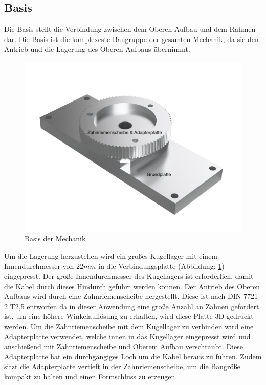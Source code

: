 \subsection{Basis}
Die Basis stellt die Verbindung zwischen dem Oberen Aufbau und dem Rahmen dar. Die Basis ist die komplexeste Baugruppe der gesamten Mechanik, da sie den Antrieb und die Lagerung des Oberen Aufbaus übernimmt. 
\begin{figure}[H]
	\centering
	\includegraphics[width=\textwidth]{images/Mechanik/Basis}
	\caption{Basis der Mechanik}
	\label{basis}
\end{figure}
Um die Lagerung herzustellen wird ein großes Kugellager mit einem Innendurchmesser von $22mm$ in die Verbindungsplatte (Abbildung: \ref{basis}) eingepresst. Der große Innendurchmesser des Kugellagers ist erforderlich, damit die Kabel durch dieses Hindurch geführt werden können. Der Antrieb des Oberen Aufbaus wird durch eine Zahnriemenscheibe hergestellt. Diese ist nach DIN 7721-2 T2,5 \cite{Tabellenbuch} entworfen da in dieser Anwendung eine große Anzahl an Zähnen gefordert ist, um eine höhere Winkelauflösung zu erhalten, wird diese Platte 3D gedruckt werden. Um die Zahnriemenscheibe mit dem Kugellager zu verbinden wird eine Adapterplatte verwendet, welche innen in das Kugellager eingepresst wird und anschießend mit Zahnriemenscheibe und Oberem Aufbau verschraubt. Diese Adapterplatte hat ein durchgängiges Loch um die Kabel heraus zu führen. Zudem sitzt die Adapterplatte vertieft in der Zahnriemenscheibe, um die Baugröße kompakt zu halten und einen Formschluss zu erzeugen. 
